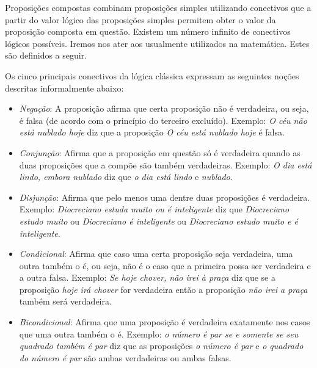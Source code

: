 Proposi\c{c}\~oes compostas combinam proposi\c{c}\~oes simples utilizando conectivos que a partir do valor l\'ogico das proposi\c{c}\~oes simples
permitem obter o valor da proposi\c{c}\~ao composta em quest\~ao. Existem um n\'umero infinito de conectivos l\'ogicos poss\'iveis. Iremos nos
ater aos usualmente utilizados na matem\'atica. Estes s\~ao definidos a seguir.

\begin{Definition}[Conectivos]
  Os cinco principais conectivos da l\'ogica cl\'assica expressam as seguintes no\c{c}\~oes descritas informalmente abaixo:
  \begin{itemize}
    \item \textit{Nega\c{c}\~ao}: A proposi\c{c}\~ao afirma que certa proposi\c{c}\~ao n\~ao \'e verdadeira, ou seja, \'e falsa
          (de acordo com o princ\'ipio do terceiro exclu\'ido). Exemplo: \textit{O c\'eu n\~ao est\'a nublado hoje} diz que a
          proposi\c{c}\~ao \textit{O c\'eu est\'a nublado hoje} \'e falsa.
    \item \textit{Conjun\c{c}\~ao}: Afirma que a proposi\c{c}\~ao em quest\~ao s\'o \'e verdadeira quando as duas proposi\c{c}\~oes que
          a comp\~oe s\~ao tamb\'em verdadeiras. Exemplo: \textit{O dia est\'a lindo, embora nublado} diz que \textit{o dia est\'a lindo}
          e \textit{nublado}.
    \item \textit{Disjun\c{c}\~ao}: Afirma que pelo menos uma dentre duas proposi\c{c}\~oes \'e verdadeira. Exemplo: \textit{Diocreciano estuda
          muito ou \'e inteligente} diz que \textit{Diocreciano estudo muito} ou \textit{Diocreciano \'e inteligente} ou
          \textit{Diocreciano estudo muito e \'e inteligente}.
    \item \textit{Condicional}: Afirma que caso uma certa proposi\c{c}\~ao seja verdadeira, uma outra tamb\'em o \'e, ou seja, n\~ao \'e o caso
          que a primeira possa ser verdadeira e a outra falsa. Exemplo: \textit{Se hoje chover, n\~ao irei \`a pra\c{c}a} diz que se a
          proposi\c{c}\~ao \textit{hoje ir\'a chover} for verdadeira ent\~ao a proposi\c{c}\~ao \textit{n\~ao irei a pra\c{c}a} tamb\'em ser\'a
          verdadeira.
     \item \textit{Bicondicional}: Afirma que uma proposi\c{c}\~ao \'e verdadeira exatamente nos casos que uma outra tamb\'em o \'e.
           Exemplo: \textit{o n\'umero \'e par se e somente se seu quadrado tamb\'em \'e par} diz que as proposi\c{c}\~oes
           \textit{o n\'umero \'e par} e \textit{o quadrado do n\'umero \'e par} s\~ao ambas verdadeiras ou ambas falsas.
  \end{itemize}
\end{Definition}

